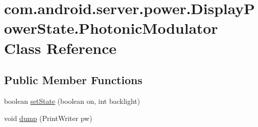 \hypertarget{classcom_1_1android_1_1server_1_1power_1_1DisplayPowerState_1_1PhotonicModulator}{\section{com.\-android.\-server.\-power.\-Display\-Power\-State.\-Photonic\-Modulator Class Reference}
\label{classcom_1_1android_1_1server_1_1power_1_1DisplayPowerState_1_1PhotonicModulator}
}
\subsection*{Public Member Functions}
\begin{DoxyCompactItemize}
\item 
boolean \hyperlink{classcom_1_1android_1_1server_1_1power_1_1DisplayPowerState_1_1PhotonicModulator_a89a57d2602393b050bea05809ad00544}{set\-State} (boolean on, int backlight)
\item 
void \hyperlink{classcom_1_1android_1_1server_1_1power_1_1DisplayPowerState_1_1PhotonicModulator_a1985eb59872e7334f832b2762c8c07d7}{dump} (Print\-Writer pw)
\end{DoxyCompactItemize}
